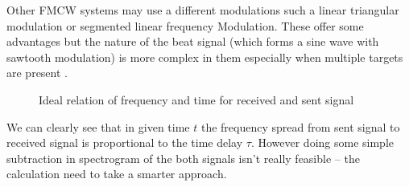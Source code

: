 Other FMCW systems may use a different modulations such a linear triangular modulation or segmented linear frequency Modulation.
These offer some advantages but the nature  of the beat signal (which forms a sine wave with sawtooth modulation) is more complex in them especially when multiple targets are present \cite{jankiraman2018}.

\begin{figure}[h!]
	\centering
{}

	\caption[Ideal relation of frequency and time for received and sent signal]{Ideal relation of frequency and time for received and sent signal}
	\label{fig:fmcw_ideal}
\end{figure}

We can clearly see that in given time $t$ the frequency spread from sent signal to received signal is proportional to the time delay $\tau$.
However doing some simple subtraction in spectrogram of the both signals isn't really feasible -- the calculation need to take a smarter approach.


